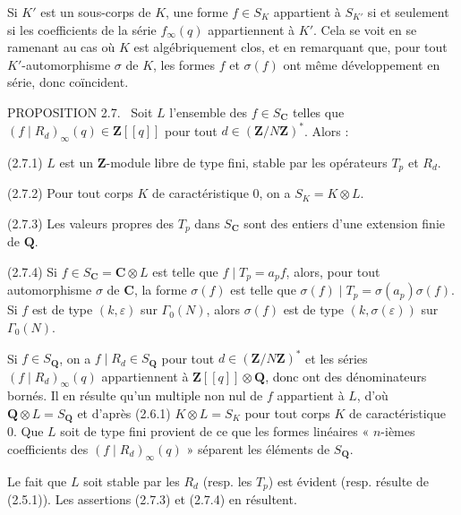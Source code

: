 \documentclass[10pt,oneside]{article}
\begin{document}
Si \(K'\) est un sous-corps de \(K\), une forme \(f\in S_K\) appartient à \(S_{K'}\) si et seulement si les coefficients de la série \(f_\infty(q)\) appartiennent à \(K'\). Cela se voit en se ramenant au cas où \(K\) est algébriquement clos, et en remarquant que, pour tout \(K'\)-automorphisme \(\sigma\) de \(K\), les formes \(f\) et \(\sigma(f)\) ont même développement en série, donc coïncident.\par

\noindent\textsc{PROPOSITION 2.7.} \textemdash\ Soit \(L\) l'ensemble des \(f\in S_{\mathbf{C}}\) telles que \((f\mid R_d)_\infty(q)\in\mathbf{Z}[[q]]\) pour tout \(d\in(\mathbf{Z}/N\mathbf{Z})^*\). Alors :\par

(2.7.1) \(L\) est un \(\mathbf{Z}\)-module libre de type fini, stable par les opérateurs \(T_p\) et \(R_d\).\par

(2.7.2) Pour tout corps \(K\) de caractéristique 0, on a \(S_K=K\otimes L\).\par

(2.7.3) Les valeurs propres des \(T_p\) dans \(S_{\mathbf{C}}\) sont des entiers d'une extension finie de \(\mathbf{Q}\).\par

(2.7.4) Si \(f\in S_{\mathbf{C}}=\mathbf{C}\otimes L\) est telle que \(f\mid T_p=a_pf\), alors, pour tout automorphisme \(\sigma\) de \(\mathbf{C}\), la forme \(\sigma(f)\) est telle que \(\sigma(f)\mid T_p=\sigma(a_p)\sigma(f)\). Si \(f\) est de type \((k,\varepsilon)\) sur \(\Gamma_0(N)\), alors \(\sigma(f)\) est de type \((k,\sigma(\varepsilon))\) sur \(\Gamma_0(N)\).\par

Si \(f\in S_{\mathbf{Q}}\), on a \(f\mid R_d\in S_{\mathbf{Q}}\) pour tout \(d\in(\mathbf{Z}/N\mathbf{Z})^*\) et les séries \((f\mid R_d)_\infty(q)\) appartiennent à \(\mathbf{Z}[[q]]\otimes\mathbf{Q}\), donc ont des dénominateurs bornés. Il en résulte qu'un multiple non nul de \(f\) appartient à \(L\), d'où \(\mathbf{Q}\otimes L=S_{\mathbf{Q}}\) et d'après (2.6.1) \(K\otimes L=S_K\) pour tout corps \(K\) de caractéristique 0. Que \(L\) soit de type fini provient de ce que les formes linéaires « \(n\)-ièmes coefficients des \((f\mid R_d)_\infty(q)\) » séparent les éléments de \(S_{\mathbf{Q}}\).\par

Le fait que \(L\) soit stable par les \(R_d\) (resp. les \(T_p\)) est évident (resp. résulte de (2.5.1)). Les assertions (2.7.3) et (2.7.4) en résultent.\par
\end{document}
